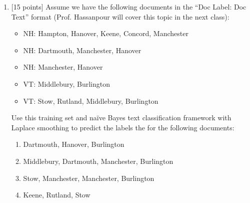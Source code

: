 \documentclass[12pt]{article}
\newenvironment{problem}[2][Problem:]{\begin{trivlist}
\item[\hskip \labelsep {\bfseries #1}\hskip \labelsep {\bfseries #2.}]}{\end{trivlist}}
\begin{document}
\begin{problem}{Natural Language Processing [50 points]}
\begin{enumerate}
    \item {[15 points]} 
     Assume we have the following documents in the ``Doc Label: Doc Text'' format (Prof. Hassanpour will cover this topic in the next class):
     \begin{itemize}
     	\item NH: Hampton, Hanover, Keene, Concord, Manchester 
	\item NH: Dartmouth, Manchester, Hanover 
	\item NH: Manchester, Hanover 
	\item VT: Middlebury, Burlington 
	\item VT: Stow, Rutland, Middlebury, Burlington
     \end{itemize}
     Use this training set and na\"ive Bayes text classification framework with Laplace smoothing to predict the labels the for the following documents:
    \begin{enumerate}
    	\item Dartmouth, Hanover, Burlington
    	\item Middlebury, Dartmouth, Manchester, Burlington
    	\item Stow, Manchester, Manchester, Burlington
    	\item Keene, Rutland, Stow
    \end{enumerate}
\end{enumerate}
\end{problem}
\end{document}
